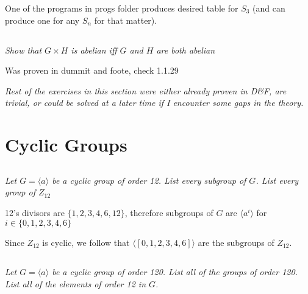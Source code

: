 \documentclass[11pt,oneside,titlepage]{book}
\newcommand{\eangle}[1]{\langle #1 \rangle}
\newcommand{\set}[1]{\{ #1 \}}
\begin{document}
One of the programs in progs folder produces desired table for $S_3$ (and can
produce one for any $S_n$ for that matter).

\subsection{}

\textit{Show that $G \times H$ is abelian iff $G$ and $H$ are both abelian}

Was proven in dummit and foote, check 1.1.29

\textit{Rest of the exercises in this section were either already proven in D\&F, are trivial, or
could be solved at a later time if I encounter some gaps in the theory.}

\section{}
\section{}
\section{}

\section{Cyclic Groups}

\subsection{}

\textit{Let $G = \eangle{a}$ be a cyclic group of order 12. List every subgroup of $G$.
List every group of $Z_{12}$}

12's divisors are $\set{1, 2, 3, 4, 6, 12}$, therefore subgroups of $G$ are
$\eangle{a^i}$ for $i \in \set{0, 1, 2, 3, 4, 6}$

Since $Z_{12}$ is cyclic, we follow that  $\eangle{[0, 1, 2, 3, 4, 6]}$
are the subgroups of $Z_{12}$.

\subsection{}

\textit{Let $G = \eangle{a}$ be a cyclic group of order 120. List all of the groups of order 120.
  List all of the elements of order 12 in $G$. }
\end{document}
